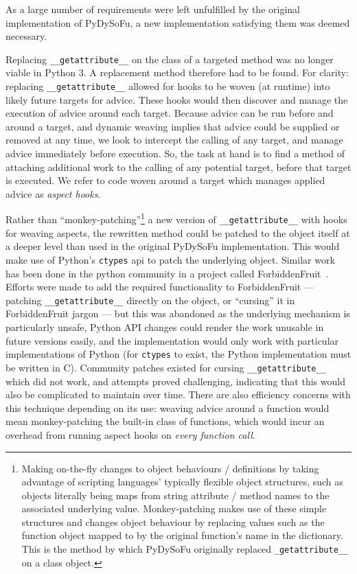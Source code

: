 As a large number of requirements were left unfulfilled by the original
implementation of PyDySoFu, a new implementation satisfying them was deemed
necessary.





Replacing \lstinline{__getattribute__} on the class of a targeted method was no
longer viable in Python 3. A replacement method therefore had to be found. For
clarity: replacing \lstinline{__getattribute__} allowed for hooks to be woven
(at runtime) into likely future targets for advice. These hooks would then
discover and manage the execution of advice around each target. Because advice
can be run before and around a target, and dynamic weaving implies that advice
could be supplied or removed at any time, we look to intercept the calling of
any target, and manage advice immediately before execution. So, the task at
hand is to find a method of attaching additional work to the calling of any
potential target, before that target is executed. We refer to code woven
around a target which manages applied advice as \emph{aspect hooks}.



Rather than ``monkey-patching''\footnote{Making on-the-fly changes to object
behaviours / definitions by taking advantage of scripting languages' typically
flexible object structures, such as objects literally being maps from string
attribute / method names to the associated underlying value. Monkey-patching
makes use of these simple structures and changes object behaviour by replacing
values such as the function object mapped to by the original function's name in
the dictionary. This is the method by which PyDySoFu originally replaced
\lstinline{_getattribute__} on a class object.} a new version of
\lstinline{__getattribute__} with hooks for weaving aspects, the rewritten
method could be patched to the object itself at a deeper level than used in the
original PyDySoFu implementation. This would make use of Python's
\lstinline{ctypes} api to patch the underlying object. Similar work has been
done in the python community in a project called
ForbiddenFruit~\cite{forbiddenfruit_repo}. Efforts were made to add the required
functionality to ForbiddenFruit --- patching \lstinline{__getattribute__}
directly on the object, or ``cursing'' it in ForbiddenFruit jargon --- but this
was abandoned as the underlying mechanism is particularly unsafe, Python API
changes could render the work unusable in future versions easily, and the
implementation would only work with particular implementations of Python (for
\lstinline{ctypes} to exist, the Python implementation must be written in C).
Community patches existed for cursing \lstinline{__getattribute__} which did not
work, and attempts proved challenging, indicating that this would also be
complicated to maintain over time. There are also efficiency concerns with this
technique depending on its use: weaving advice around a function would mean
monkey-patching the built-in class of functions, which would incur an overhead
from running aspect hooks on \emph{every function call}.

